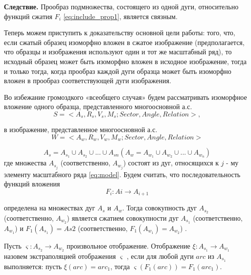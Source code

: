 \textbf{Следствие.}
Прообраз  подмножества, состоящего из одной дуги, относительно функций сжатия  $F_i$ \ref{eq:include_prop1}, является связным.

Теперь можем приступить  к доказательству основной цели работы: того, что, если сжатый образец изоморфно вложен в сжатое изображение (предполагается, что образцы и изображения используют один и тот же масштабный ряд), то исходный  образец может быть изоморфно вложен в исходное изображение, тогда и только тогда, когда прообраз каждой дуги образца может быть изоморфно вложен в прообраз соответствующей дуги изображения.

Во избежание громоздкого «всеобщего случая» будем рассматривать изоморфное вложение одного образца, представленного многоосновной  а.с.  
\begin{equation}
S  = < A_s, R_s, V_s, M_s; Sector, Angle, Relation >,                     %
\label{scale:results:template}
\end{equation}
          
в изображение,  представленное многоосновной а.с.  
\begin{equation}
W  = < A_w, R_w, V_w, M_w; Sector,  Angle, Relation >                     %
\label{scale:results:image}
\end{equation}

\begin{equation}
A_s = A_{s_1} \cup A_{s_2} \cup ... \cup A_{sn}  (A_w = A_{w_1} \cup A_{w_2} \cup ... \cup A_{w_n})                     %
\label{scale:results:image}
\end{equation}
где  множества   $A_{s_j}$ (соответственно,  $A_{w_j}$) состоят из дуг, относящихся к $j$ - му элементу   масштабного ряда \ref{eq:model}. 
Будем считать, что последовательность функций вложения  
\begin{equation}
F_i : Ai \to A_{i+1}  %
\label{scale:results:func1}
\end{equation}

определена на множествах дуг $A_s$  и $A_w$.  Тогда совокупность дуг $A_{s_2}$ (соответственно,  $A_{w_2}$) является  сжатием   совокупности дуг   $A_{s_1}$ (соответственно,  $A_{w_1}$)    и  $F_1 ( A_{s_1})  =  As2$ (соответственно,  $F_1 ( A_{w_1} )  =  A_{w_2}$) .  

\begin{definition}
Пусть $\varsigma : A_{s_2} \to A_{w_2}$  произвольное отображение. Отображение $\xi : A_{s_1} \to A_{w_1}$ назовем экстраполяцией отображения $\varsigma$ , если для любой дуги   $arc$  из $A_{s_1}$ выполняется:  пусть $\xi(arc)  =  arc_1$,   тогда  $\varsigma (F_1(arc) )  =  F_1(arc_1)$. 
\end{definition}
          
